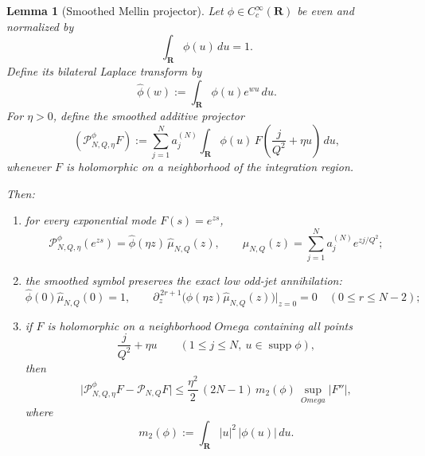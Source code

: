 \documentclass[11pt,a4paper]{amsart}
\def\Omega{Omega}%
\theoremstyle{plain}
\newtheorem{lemma}[theorem]{Lemma}
\theoremstyle{definition}
\begin{document}
\begin{lemma}[Smoothed Mellin projector]
\label{lem:smoothed-mellin-projector}
Let $\phi\in C_c^\infty(\mathbf R)$ be even and normalized by
\[
\int_{\mathbf R}\phi(u)\,du=1.
\]
Define its bilateral Laplace transform by
\[
\widehat\phi(w):=\int_{\mathbf R}\phi(u)e^{wu}\,du.
\]
For $\eta>0$, define the smoothed additive projector
\[
(\mathcal P_{N,Q,\eta}^{\phi}F)
:=
\sum_{j=1}^N a_j^{(N)}
\int_{\mathbf R}\phi(u)\,
F\!\left(\frac{j}{Q^2}+\eta u\right)\,du,
\]
whenever $F$ is holomorphic on a neighborhood of the integration region.

Then:

\begin{enumerate}
\item for every exponential mode $F(s)=e^{zs}$,
\[
\mathcal P_{N,Q,\eta}^{\phi}(e^{zs})
=
\widehat\phi(\eta z)\,\widehat\mu_{N,Q}(z),
\qquad
\widehat\mu_{N,Q}(z)=\sum_{j=1}^N a_j^{(N)}e^{zj/Q^2};
\]

\item the smoothed symbol preserves the exact low odd-jet annihilation:
\[
\widehat\phi(0)\widehat\mu_{N,Q}(0)=1,
\qquad
\partial_z^{\,2r+1}\!\bigl(\widehat\phi(\eta z)\widehat\mu_{N,Q}(z)\bigr)\Big|_{z=0}=0
\quad (0\le r\le N-2);
\]

\item if $F$ is holomorphic on a neighborhood $\Omega$ containing all points
\[
\frac{j}{Q^2}+\eta u
\qquad
(1\le j\le N,\ u\in \operatorname{supp}\phi),
\]
then
\[
\bigl|\mathcal P_{N,Q,\eta}^{\phi}F-\mathcal P_{N,Q}F\bigr|
\le
\frac{\eta^2}{2}\,(2N-1)\,m_2(\phi)\,
\sup_{\Omega}|F''|,
\]
where
\[
m_2(\phi):=\int_{\mathbf R}|u|^2\,|\phi(u)|\,du.
\]
\end{enumerate}
\end{lemma}
\end{document}
